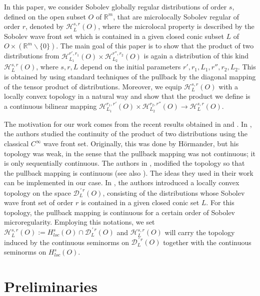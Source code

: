 \documentclass{amsart}
\theoremstyle{definition}
\begin{document}
In this paper, we consider Sobolev globally regular distributions of order $s$, defined on the open subset $O$ of $\mathbb{R}^m$, that are microlocally Sobolev regular of order $r$, denoted by $\mathscr{H}_L ^{s,r} (O)$, where the microlocal property is described by the Sobolev wave front set which is contained in a given closed conic subset $L$ of $O\times (\mathbb{R}^m \backslash \{ 0 \})$. The main goal of this paper is to show that the product of two distributions from $\mathscr{H}_{L_1} ^{r',r_1} (O) \times \mathscr{H}_{L_2} ^{r'',r_2} (O)$ is again a distribution of this kind $\mathscr{H}_{L} ^{s,r} (O)$, where $s,r,L$ depend on the initial parameters $r',r_1,L_1,r'',r_2,L_2$. This is obtained by using standard techniques of the pullback by the diagonal mapping of the tensor product of distributions. Moreover, we equip $\mathscr{H}_L ^{s,r} (O)$ with a locally convex topology in a natural way and show that the product we define is a continuous bilinear mapping $\mathscr{H}_{L_1} ^{r_1,r'} (O) \times \mathscr{H}_{L_2} ^{r_2,r''} (O) \to \mathscr{H}_{L} ^{s,r} (O)$.

The motivation for our work comes from the recent results obtained in \cite{Brouder} and \cite{PP}. In \cite{Brouder}, the authors studied the continuity of the product of two distributions using the classical $C^{\infty}$ wave front set. Originally, this was done by H\"ormander, but his topology was weak, in the sense that the pullback mapping was not continuous; it is only sequentially continuous. The authors in \cite{Brouder}, modified the topology so that the pullback mapping is continuous (see also \cite{dab-br}). The ideas they used in their work can be implemented in our case. In \cite{PP}, the authors introduced a locally convex topology on the space $\mathcal{D}_{L}^{\,\prime\, r} (O)$, consisting of the distributions whose Sobolev wave front set of order $r$ is contained in a given closed conic set $L$. For this topology, the pullback mapping is continuous for a certain order of Sobolev microregularity. Employing this notations, we set $\mathscr{H}_L ^{s,r} (O):=H_{loc} ^{s} (O)\cap \mathcal{D}_{L}^{\,\prime\, r} (O)$ and $\mathscr{H}_L ^{s,r} (O)$ will carry the topology induced by the continuous seminorms on $\mathcal{D}_{L}^{\,\prime\, r} (O)$ together with the continuous seminorms on $H_{loc} ^{s} (O)$.


\section{Preliminaries}\label{sec2}
\end{document}

